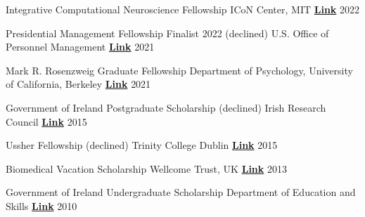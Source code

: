 

\begin{cvhonors}

 \cvhonor
    {Integrative Computational Neuroscience Fellowship} %
    {ICoN Center, MIT}
    {\href{https://yangtan.mit.edu/supported-researchers/}{\textbf{Link}}}
  	{2022}

 \cvhonor
    {Presidential Management Fellowship Finalist 2022 (declined)} %
    {U.S. Office of Personnel Management}
    {\href{https://apply.pmf.gov/finalists.aspx}{\textbf{Link}}}
  	{2021}

 \cvhonor
    {Mark R. Rosenzweig Graduate Fellowship} %
    {Department of Psychology, University of California, Berkeley}
    {\href{https://psychology.berkeley.edu/give/endowed-funds}{\textbf{Link}}}
  	{2021}

 \cvhonor
   {Government of Ireland Postgraduate Scholarship (declined)}
   {Irish Research Council}
   {\href{https://research.ie/funding/goipg/}{\textbf{Link}}}
   {2015}
   
 \cvhonor
   {Ussher Fellowship (declined)}
   {Trinity College Dublin}
   {\href{https://www.tcd.ie/study/international/scholarships/Postgraduate/ussher.php}{\textbf{Link}}}
   {2015}

  \cvhonor
   {Biomedical Vacation Scholarship}
   {Wellcome Trust, UK}
   {\href{https://wellcome.org/}{\textbf{Link}}}
   {2013}

  \cvhonor
   {Government of Ireland Undergraduate Scholarship}
   {Department of Education and Skills}
   {\href{https://www.gov.ie/en/service/third-level-scholarships/}{\textbf{Link}}}
   {2010}
   
\end{cvhonors}


